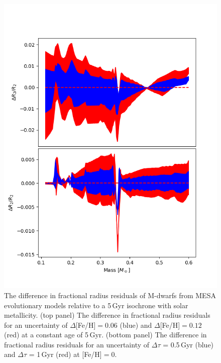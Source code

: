 \begin{figure}
    \centering
    \includegraphics[scale=0.8]{9-Discussion/images/radius_sensitivity.png}
    \caption{The difference in fractional radius residuals of M-dwarfs from MESA evolutionary models relative to a 5\,Gyr isochrone with solar metallicity. (top panel) The difference in fractional radius residuals for an uncertainty of $\Delta$[Fe/H]$ = 0.06$ (blue) and $\Delta$[Fe/H]$ = 0.12$ (red) at a constant age of 5\,Gyr. (bottom panel) The difference in fractional radius residuals for an uncertainty of $\Delta \tau$ = 0.5\,Gyr (blue) and $\Delta \tau$ = 1\,Gyr (red) at [Fe/H]$ = 0$.}
    \label{fig:metalicity_diff}
\end{figure}


